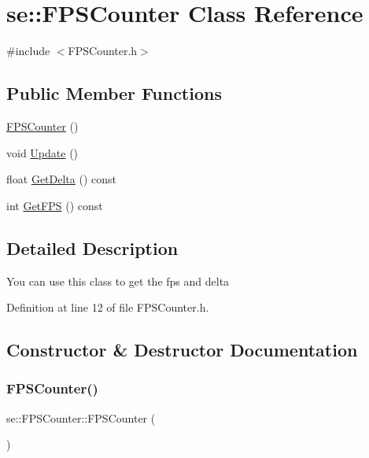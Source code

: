 \hypertarget{classse_1_1_f_p_s_counter}{}\section{se\+:\+:F\+P\+S\+Counter Class Reference}
\label{classse_1_1_f_p_s_counter}


{\ttfamily \#include $<$F\+P\+S\+Counter.\+h$>$}

\subsection*{Public Member Functions}
\begin{DoxyCompactItemize}
\item 
\mbox{\hyperlink{classse_1_1_f_p_s_counter_ad9b3e1f8314a41194aced879a346d32b}{F\+P\+S\+Counter}} ()
\item 
void \mbox{\hyperlink{classse_1_1_f_p_s_counter_a863da58355d25fcf9f76b9cc697101e4}{Update}} ()
\item 
float \mbox{\hyperlink{classse_1_1_f_p_s_counter_ac39be1bd1ff3954813d6d5733825abb1}{Get\+Delta}} () const
\item 
int \mbox{\hyperlink{classse_1_1_f_p_s_counter_a6e3fc56e01f9696ce549264f6246fa01}{Get\+F\+PS}} () const
\end{DoxyCompactItemize}


\subsection{Detailed Description}
You can use this class to get the fps and delta 

Definition at line 12 of file F\+P\+S\+Counter.\+h.



\subsection{Constructor \& Destructor Documentation}
\mbox{\label{classse_1_1_f_p_s_counter_ad9b3e1f8314a41194aced879a346d32b}} 
\subsubsection{\texorpdfstring{F\+P\+S\+Counter()}{FPSCounter()}}
{\footnotesize\ttfamily se\+::\+F\+P\+S\+Counter\+::\+F\+P\+S\+Counter (\begin{DoxyParamCaption}{ }\end{DoxyParamCaption})}



